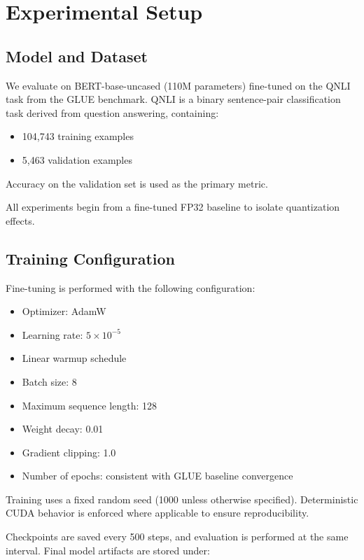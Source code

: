 \documentclass[conference]{IEEEtran}
\begin{document}
\section{Experimental Setup}

\subsection{Model and Dataset}

We evaluate on BERT-base-uncased (110M parameters) fine-tuned on the QNLI task from the GLUE benchmark. QNLI is a binary sentence-pair classification task derived from question answering, containing:

\begin{itemize}
\item 104,743 training examples
\item 5,463 validation examples
\end{itemize}

Accuracy on the validation set is used as the primary metric.

All experiments begin from a fine-tuned FP32 baseline to isolate quantization effects.

\subsection{Training Configuration}

Fine-tuning is performed with the following configuration:

\begin{itemize}
\item Optimizer: AdamW
\item Learning rate: $5 \times 10^{-5}$
\item Linear warmup schedule
\item Batch size: 8
\item Maximum sequence length: 128
\item Weight decay: 0.01
\item Gradient clipping: 1.0
\item Number of epochs: consistent with GLUE baseline convergence
\end{itemize}

Training uses a fixed random seed (1000 unless otherwise specified). Deterministic CUDA behavior is enforced where applicable to ensure reproducibility.

Checkpoints are saved every 500 steps, and evaluation is performed at the same interval. Final model artifacts are stored under:
\end{document}
